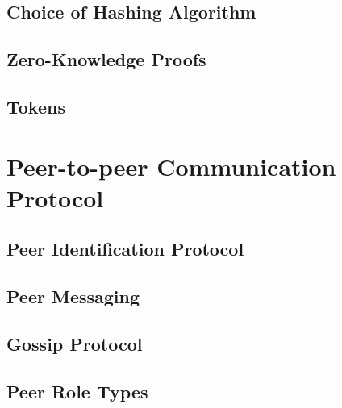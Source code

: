 \documentclass[a4paper, 12pt]{book}
\begin{document}
\section{Choice of Hashing Algorithm}\label{Sec:Has}



\section{Zero-Knowledge Proofs}\label{Sec:ZKP}



\section{Tokens}\label{Sec:Tok}






\chapter{Peer-to-peer Communication Protocol} \label{Cha:NAPI}



\section{Peer Identification Protocol}\label{Sec:PIP}



\section{Peer Messaging}



\section{Gossip Protocol}



\section{Peer Role Types}\label{Sec:PRT}

\end{document}
